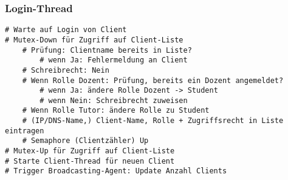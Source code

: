 \subsubsection{Login-Thread}
\begin{lstlisting}
# Warte auf Login von Client
# Mutex-Down für Zugriff auf Client-Liste 
    # Prüfung: Clientname bereits in Liste?
        # wenn Ja: Fehlermeldung an Client
    # Schreibrecht: Nein
    # Wenn Rolle Dozent: Prüfung, bereits ein Dozent angemeldet?
        # wenn Ja: ändere Rolle Dozent -> Student
        # wenn Nein: Schreibrecht zuweisen
    # Wenn Rolle Tutor: ändere Rolle zu Student
    # (IP/DNS-Name,) Client-Name, Rolle + Zugriffsrecht in Liste eintragen
    # Semaphore (Clientzähler) Up
# Mutex-Up für Zugriff auf Client-Liste
# Starte Client-Thread für neuen Client
# Trigger Broadcasting-Agent: Update Anzahl Clients
\end{lstlisting}

